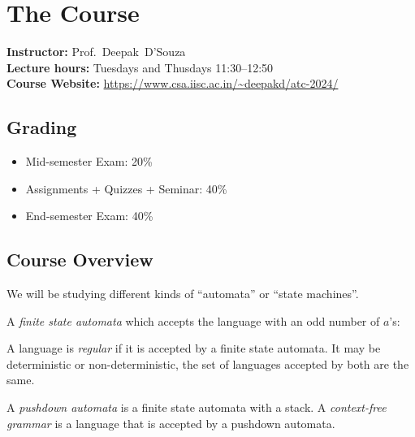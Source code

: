 \chapter*{The Course}

\textbf{Instructor:} Prof.~Deepak~D'Souza\\
\textbf{Lecture hours:} Tuesdays and Thusdays 11:30--12:50\\
\textbf{Course Website:} \url{https://www.csa.iisc.ac.in/~deepakd/atc-2024/}

\section*{Grading}
\begin{itemize}
    \item Mid-semester Exam: 20\%
    \item Assignments + Quizzes + Seminar: 40\%
    \item End-semester Exam: 40\%
\end{itemize}

\section*{Course Overview}
We will be studying different kinds of ``automata'' or ``state machines''.

A \emph{finite state automata} which accepts the language with an odd
number of $a$'s:
\begin{center}
\end{center}
A language is \emph{regular} if it is accepted by a finite state automata.
It may be deterministic or non-deterministic, the set of languages accepted
by both are the same.

A \emph{pushdown automata} is a finite state automata with a stack.
A \emph{context-free grammar} is a language that is accepted by a pushdown
automata.
